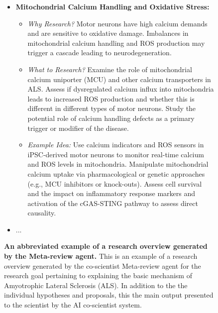\begin{figure}[htbp!]
\begin{tcolorbox}
\begin{itemize}
\begin{itemize}
\begin{itemize}
        \end{itemize}
        \item \textbf{Mitochondrial Calcium Handling and Oxidative Stress:}
        \begin{itemize}
            \item \textit{Why Research?} Motor neurons have high calcium demands and are sensitive to oxidative damage. Imbalances in mitochondrial calcium handling and ROS production may trigger a cascade leading to neurodegeneration.
            \item \textit{What to Research?} Examine the role of mitochondrial calcium uniporter (MCU) and other calcium transporters in ALS. Assess if dysregulated calcium influx into mitochondria leads to increased ROS production and whether this is different in different types of motor neurons. Study the potential role of calcium handling defects as a primary trigger or modifier of the disease.
            \item \textit{Example Idea:} Use calcium indicators and ROS sensors in iPSC-derived motor neurons to monitor real-time calcium and ROS levels in mitochondria. Manipulate mitochondrial calcium uptake via pharmacological or genetic approaches (e.g., MCU inhibitors or knock-outs). Assess cell survival and the impact on inflammatory response markers and activation of the cGAS-STING pathway to assess direct causality.
        \end{itemize}
        \item ...
    \end{itemize}
\end{itemize}
\end{tcolorbox}
\vspace{0.1cm}
\caption{\textbf{An abbreviated example of a research overview generated by the Meta-review agent.} This is an example of a research overview generated by the co-scientist Meta-review agent for the research goal pertaining to explaining the basic mechanism of Amyotrophic Lateral Sclerosis (ALS). In addition to the the individual hypotheses and proposals, this the main output presented to the scientist by the AI co-scientist system.}
\label{fig:ex_overview}
\end{figure}


